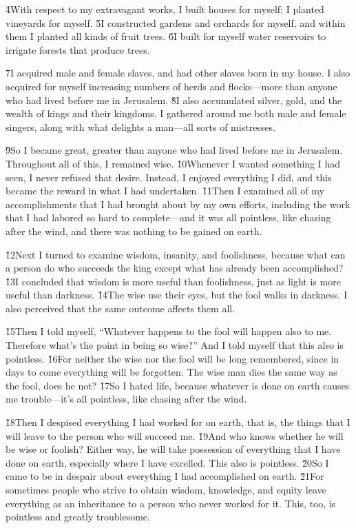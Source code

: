 \v{4}With respect to my extravagant works, I built houses for myself; I planted vineyards for myself. \v{5}I constructed gardens and orchards for myself, and within them I planted all kinds of fruit trees. \v{6}I built for myself water reservoirs to irrigate forests that produce trees.

\v{7}I acquired male and female slaves, and had other slaves born in my house. I also acquired for myself increasing numbers of herds and flocks---more than anyone who had lived before me in Jerusalem. \v{8}I also accumulated silver, gold, and the wealth of kings and their kingdoms. I gathered around me both male and female singers, along with what delights a man---all sorts of mistresses.

\v{9}So I became great, greater than anyone who had lived before me in Jerusalem. Throughout all of this, I remained wise. \v{10}Whenever I wanted something I had seen, I never refused that desire. Instead, I enjoyed everything I did, and this became the reward in what I had undertaken. \v{11}Then I examined all of my accomplishments that I had brought about by my own efforts, including the work that I had labored so hard to complete---and it was all pointless, like chasing after the wind, and there was nothing to be gained on earth.

\v{12}Next I turned to examine wisdom, insanity, and foolishness, because what can a person do who succeeds the king except what has already been accomplished? \v{13}I concluded that wisdom is more useful than foolishness, just as light is more useful than darkness. \v{14}The wise use their eyes, but the fool walks in darkness. I also perceived that the same outcome affects them all.

\v{15}Then I told myself, ``Whatever happens to the fool will happen also to me. Therefore what's the point in being so wise?'' And I told myself that this also is pointless. \v{16}For neither the wise nor the fool will be long remembered, since in days to come everything will be forgotten. The wise man dies the same way as the fool, does he not? \v{17}So I hated life, because whatever is done on earth causes me trouble---it's all pointless, like chasing after the wind.

\v{18}Then I despised everything I had worked for on earth, that is, the things that I will leave to the person who will succeed me. \v{19}And who knows whether he will be wise or foolish? Either way, he will take possession of everything that I have done on earth, especially where I have excelled. This also is pointless. \v{20}So I came to be in despair about everything I had accomplished on earth. \v{21}For sometimes people who strive to obtain wisdom, knowledge, and equity leave everything as an inheritance to a person who never worked for it. This, too, is pointless and greatly troublesome.

